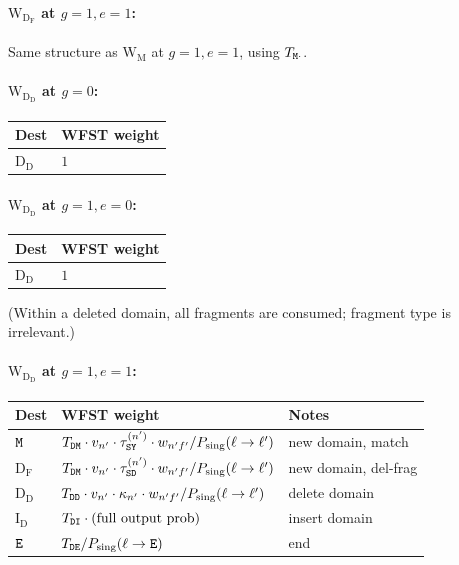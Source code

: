 \paragraph{$\mathrm{W_{D_F}}$ at $g=1, e=1$:}
Same structure as $\mathrm{W_M}$ at $g=1, e=1$, using $T_{{\tt M}\cdot}$.

\paragraph{$\mathrm{W_{D_D}}$ at $g=0$:}
\begin{center}
\renewcommand{\arraystretch}{1.3}
\begin{tabular}{ll}
\hline
Dest & WFST weight \\
\hline
$\mathrm{D_D}$ & $1$ \\
\hline
\end{tabular}
\end{center}

\paragraph{$\mathrm{W_{D_D}}$ at $g=1, e=0$:}
\begin{center}
\renewcommand{\arraystretch}{1.3}
\begin{tabular}{ll}
\hline
Dest & WFST weight \\
\hline
$\mathrm{D_D}$ & $1$ \\
\hline
\end{tabular}
\end{center}
(Within a deleted domain, all fragments are consumed; fragment type is irrelevant.)

\paragraph{$\mathrm{W_{D_D}}$ at $g=1, e=1$:}
\begin{center}
\renewcommand{\arraystretch}{1.3}
\begin{tabular}{lll}
\hline
Dest & WFST weight & Notes \\
\hline
${\tt M}$ &
  $T_{{\tt D}{\tt M}} \cdot v_{n'} \cdot
   \tau^{(n')}_{{\tt S}{\tt Y}} \cdot w_{n'f'}
   / P_{\rm sing}(\ell \to \ell')$ &
  new domain, match \\
$\mathrm{D_F}$ &
  $T_{{\tt D}{\tt M}} \cdot v_{n'} \cdot
   \tau^{(n')}_{{\tt S}{\tt D}} \cdot w_{n'f'}
   / P_{\rm sing}(\ell \to \ell')$ &
  new domain, del-frag \\
$\mathrm{D_D}$ &
  $T_{{\tt D}{\tt D}} \cdot v_{n'} \cdot
   \kappa_{n'} \cdot w_{n'f'}
   / P_{\rm sing}(\ell \to \ell')$ &
  delete domain \\
$\mathrm{I_D}$ &
  $T_{{\tt D}{\tt I}} \cdot (\text{full output prob})$ &
  insert domain \\
${\tt E}$ & $T_{{\tt D}{\tt E}} / P_{\rm sing}(\ell \to {\tt E})$ &
  end \\
\hline
\end{tabular}
\end{center}


